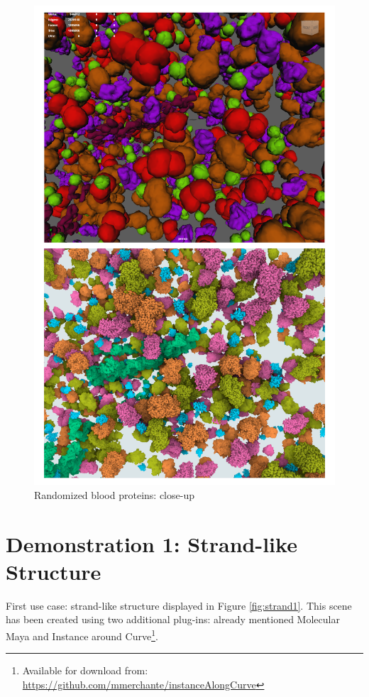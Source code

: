 \documentclass[
  digital, %
  table,   %
  nolof,     %
  nolot,     %
  oneside,
]{fithesis3}
\begin{document}
\begin{figure}
  \centering
  \includegraphics[scale=0.4]{images/demonstration/blood-closeup.png}
  \caption{Randomized blood proteins: close-up}
  \label{fig:blood-random-close}
\end{figure}

\section{Demonstration 1: Strand-like Structure}
First use case: strand-like structure displayed in Figure \ref{fig:strand1}. This scene has been created using two additional plug-ins: already mentioned Molecular Maya and Instance around Curve\footnote{Available for download from: \url{https://github.com/mmerchante/instanceAlongCurve}}.
\end{document}
